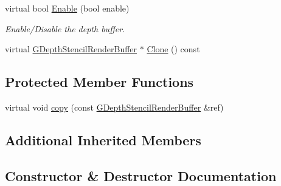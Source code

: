 \begin{DoxyCompactItemize}
\item 
\mbox{\label{class_geometry_engine_1_1_geometry_buffer_1_1_g_depth_stencil_render_buffer_ad5c121dac465229736e6159981b965cb}} 
virtual bool \mbox{\hyperlink{class_geometry_engine_1_1_geometry_buffer_1_1_g_depth_stencil_render_buffer_ad5c121dac465229736e6159981b965cb}{Enable}} (bool enable)
\begin{DoxyCompactList}\small\item\em Enable/\+Disable the depth buffer. \end{DoxyCompactList}\item 
virtual \mbox{\hyperlink{class_geometry_engine_1_1_geometry_buffer_1_1_g_depth_stencil_render_buffer}{G\+Depth\+Stencil\+Render\+Buffer}} $\ast$ \mbox{\hyperlink{class_geometry_engine_1_1_geometry_buffer_1_1_g_depth_stencil_render_buffer_a5c64d816141633964dd33605fbf42f97}{Clone}} () const
\end{DoxyCompactItemize}
\subsection*{Protected Member Functions}
\begin{DoxyCompactItemize}
\item 
virtual void \mbox{\hyperlink{class_geometry_engine_1_1_geometry_buffer_1_1_g_depth_stencil_render_buffer_a85aeb8570c83b53e47c42fe1310bd5f1}{copy}} (const \mbox{\hyperlink{class_geometry_engine_1_1_geometry_buffer_1_1_g_depth_stencil_render_buffer}{G\+Depth\+Stencil\+Render\+Buffer}} \&ref)
\end{DoxyCompactItemize}
\subsection*{Additional Inherited Members}


\subsection{Constructor \& Destructor Documentation}
\mbox{\label{class_geometry_engine_1_1_geometry_buffer_1_1_g_depth_stencil_render_buffer_ad893bf8d5e68e1a4e7cf60901160cfd7}} 
